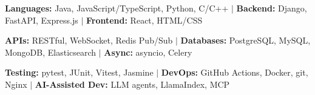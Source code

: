 \item\small{\textbf{Languages:} Java, JavaScript/TypeScript, Python, C/C++ $|$ \textbf{Backend:} Django, FastAPI, Express.js $|$ \textbf{Frontend:} React, HTML/CSS}
\item\small{\textbf{APIs:} RESTful, WebSocket, Redis Pub/Sub $|$ \textbf{Databases:} PostgreSQL, MySQL, MongoDB, Elasticsearch $|$ \textbf{Async:} asyncio, Celery}
\item\small{\textbf{Testing:} pytest, JUnit, Vitest, Jasmine $|$ \textbf{DevOps:} GitHub Actions, Docker, git, Nginx $|$ \textbf{AI-Assisted Dev:} LLM agents, LlamaIndex, MCP}%

